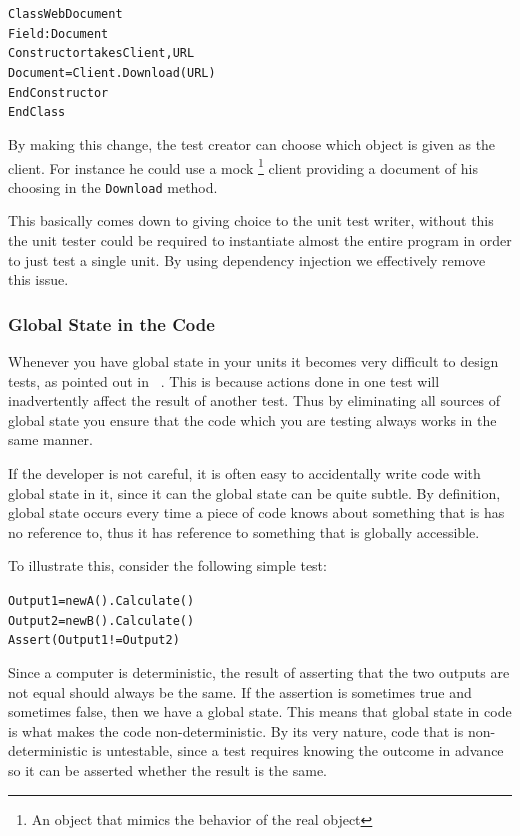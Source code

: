\begin{alltt}
Class WebDocument
    Field: Document 
    Constructor takes Client, URL 		
        Document = Client.Download(URL) 	
    EndConstructor 
EndClass
\end{alltt}

By making this change, the test creator can choose which object is
given as the client. For instance he could use a mock%
\footnote{An object that mimics the behavior of the real object%
} client providing a document of his choosing in the \texttt{Download}
method.

This basically comes down to giving choice to the unit test writer,
without this the unit tester could be required to instantiate almost
the entire program in order to just test a single unit. By using dependency
injection we effectively remove this issue.


\subsubsection*{Global State in the Code}

Whenever you have global state in your units it becomes very difficult
to design tests, as pointed out in ~\cite{LectureSingletons}. This
is because actions done in one test will inadvertently affect the
result of another test. Thus by eliminating all sources of global
state you ensure that the code which you are testing always works
in the same manner.

If the developer is not careful, it is often easy to accidentally
write code with global state in it, since it can the global state
can be quite subtle. By definition, global state occurs every time
a piece of code knows about something that is has no reference to,
thus it has reference to something that is globally accessible.

To illustrate this, consider the following simple test:

\begin{alltt}
Output1 = new A().Calculate() 
Output2 = new B().Calculate() 
Assert(Output1 != Output2)
\end{alltt}

Since a computer is deterministic, the result of asserting that the
two outputs are not equal should always be the same. If the assertion
is sometimes true and sometimes false, then we have a global state.
This means that global state in code is what makes the code non-deterministic.
By its very nature, code that is non-deterministic is untestable,
since a test requires knowing the outcome in advance so it can be
asserted whether the result is the same.

